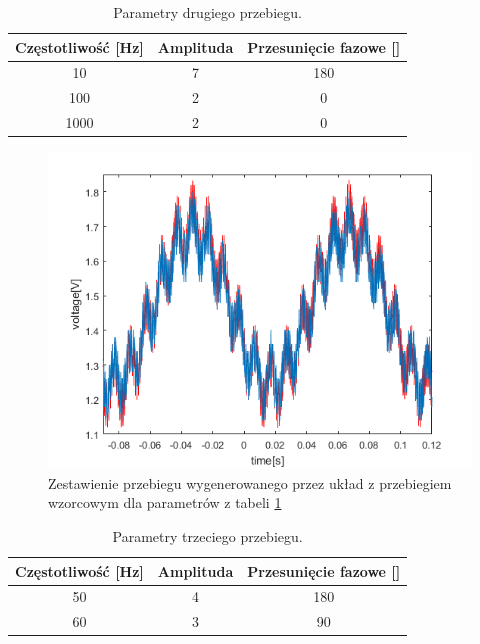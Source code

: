 \begin{table}[h]
	\caption{Parametry drugiego przebiegu.}
	\label{tab_10_100_1000}
	\centering
	
	\begin{tabular}{|c|c|c|}
		\hline
		\textbf{Częstotliwość [Hz]} & \textbf{Amplituda} & \textbf{Przesunięcie fazowe [\textdegree]}\\
		\hline
		10 & 7 & 180 \\
		\hline
		100 & 2 & 0 \\
		\hline
		1000 & 2 & 0 \\
		\hline
	\end{tabular}
\end{table}

\begin{figure}[h!]
	\centering
	\includegraphics[scale = 0.8]{fig/10_100_1000.png}
	\caption		
	{Zestawienie przebiegu wygenerowanego przez układ z przebiegiem wzorcowym dla parametrów z tabeli \ref{tab_10_100_1000}}
	\label{fig:10_100_1000}
\end{figure}

\begin{table}[h]
	\caption{Parametry trzeciego przebiegu.}
	\label{tab_50_60}
	\centering
	
	\begin{tabular}{|c|c|c|}
		\hline
		\textbf{Częstotliwość [Hz]} & \textbf{Amplituda} & \textbf{Przesunięcie fazowe [\textdegree]}\\
		\hline
		50 & 4 & 180 \\
		\hline
		60 & 3 & 90 \\
		\hline
	\end{tabular}
\end{table}

